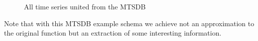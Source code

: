 \begin{figure}[tp]
  \centering
  
  \caption{All time series united from the MTSDB}
  \label{fig:exemple:4mrdtot}
\end{figure}

Note that with this MTSDB example schema we achieve not an
approximation to the original function but an extraction of some
interesting information.




